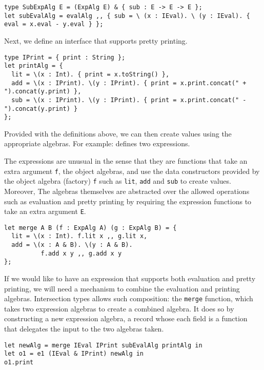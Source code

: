 \begin{lstlisting}
type SubExpAlg E = (ExpAlg E) & { sub : E -> E -> E };
let subEvalAlg = evalAlg ,, { sub = \ (x : IEval). \ (y : IEval). { eval = x.eval - y.eval } };
\end{lstlisting}

Next, we define an interface that supports pretty printing.

\begin{lstlisting}
type IPrint = { print : String };
let printAlg = {
  lit = \(x : Int). { print = x.toString() },
  add = \(x : IPrint). \(y : IPrint). { print = x.print.concat(" + ").concat(y.print) },
  sub = \(x : IPrint). \(y : IPrint). { print = x.print.concat(" - ").concat(y.print) }
};
\end{lstlisting}

Provided with the definitions above, we can then create values using the
appropriate algebras. For example:
defines two expressions.

The expressions are unusual in the sense that they are functions that take an
extra argument \lstinline{f}, the object algebras, and use the data constructors
provided by the object algebra (factory) \lstinline{f} such as \lstinline{lit},
\lstinline{add} and \lstinline{sub} to create values. Moreover, The algebras
themselves are abstracted over the allowed operations such as evaluation and
pretty printing by requiring the expression functions to take an extra argument
\lstinline{E}.

\begin{lstlisting}
let merge A B (f : ExpAlg A) (g : ExpAlg B) = {
  lit = \(x : Int). f.lit x ,, g.lit x,
  add = \(x : A & B). \(y : A & B).
          f.add x y ,, g.add x y
};
\end{lstlisting}

If we would like to have an expression that supports both evaluation and pretty
printing, we will need a mechanism to combine the evaluation and printing
algebras. Intersection types allows such composition: the \lstinline{merge}
function, which takes two expression algebras to create a combined algebra. It
does so by constructing a new expression algebra, a record whose each field is a
function that delegates the input to the two algebras taken.

\begin{lstlisting}
let newAlg = merge IEval IPrint subEvalAlg printAlg in
let o1 = e1 (IEval & IPrint) newAlg in
o1.print
\end{lstlisting}

